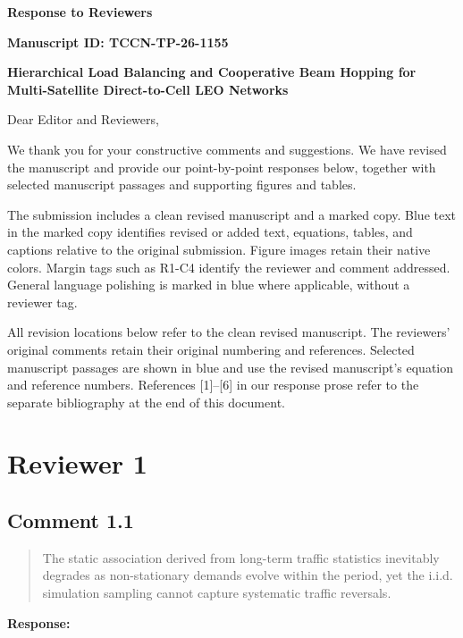 \documentclass[11pt,a4paper]{article}
\begin{document}
\begin{center}{\Large\bfseries Response to Reviewers}\par\vspace{0.6em}
{\bfseries Manuscript ID: TCCN-TP-26-1155}\par
{\bfseries Hierarchical Load Balancing and Cooperative Beam Hopping for Multi-Satellite Direct-to-Cell LEO Networks}
\end{center}
Dear Editor and Reviewers,

We thank you for your constructive comments and suggestions. We have revised the manuscript and provide our point-by-point responses below, together with selected manuscript passages and supporting figures and tables.

The submission includes a clean revised manuscript and a marked copy. Blue text in the marked copy identifies revised or added text, equations, tables, and captions relative to the original submission. Figure images retain their native colors. Margin tags such as R1-C4 identify the reviewer and comment addressed. General language polishing is marked in blue where applicable, without a reviewer tag.

All revision locations below refer to the clean revised manuscript. The reviewers' original comments retain their original numbering and references. Selected manuscript passages are shown in blue and use the revised manuscript's equation and reference numbers. References [1]--[6] in our response prose refer to the separate bibliography at the end of this document.


\clearpage\section*{Reviewer 1}

\subsection*{Comment 1.1}

\begin{quote}\small The static association derived from long-term traffic statistics inevitably degrades as non-stationary demands evolve within the period, yet the i.i.d. simulation sampling cannot capture systematic traffic reversals.\end{quote}

\textbf{Response:}\par
\end{document}
